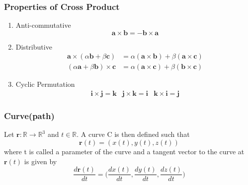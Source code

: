 \documentclass[11pt, oneside]{article}
\renewcommand{\vec}[1]{\mathbf{#1}}
\begin{document}
\subsubsection{Properties of Cross Product}
\begin{enumerate}
  \item Anti-commutative\begin{equation}
 \vec{a}  \times\vec{b}=-\vec{b}\times\vec{a}
 \end{equation}
 \item Distributive \begin{align}
    \vec{a}\times(\alpha\vec{b}+\beta\vec{c}) &= \alpha(\vec{a}\times\vec{b}) + \beta(\vec{a}\times\vec{c})\\
    (\alpha\vec{a}+\beta\vec{b})\times\vec{c} &= \alpha(\vec{a}\times\vec{c}) + \beta(\vec{b}\times\vec{c})
  \end{align}
\item Cyclic Permutation
  \begin{eqnarray}
    \vec{i}\times\vec{j}=\vec{k} &\vec{j}\times\vec{k}=\vec{i} &\vec{k}\times\vec{i}=\vec{j}
  \end{eqnarray}
\begin{figure}[!h]
\centering

\end{figure}

\end{enumerate}

\subsubsection{Curve(path)}
Let $\vec{r}:\mathbb{R} \rightarrow \mathbb{R}^3$ and $t \in \mathbb{R}$. A curve C is then defined such that
\begin{equation}
  \vec{r}(t) = (x(t),y(t),z(t))
\end{equation}
where t is called a parameter of the curve and a tangent vector to the curve at $\vec{r}(t)$ is given by
\begin{equation}
  \frac{d\vec{r}(t)}{dt}=\bigg(\frac{dx(t)}{dt},\frac{dy(t)}{dt},\frac{dz(t)}{dt}\bigg)
\end{equation}
\end{document}
